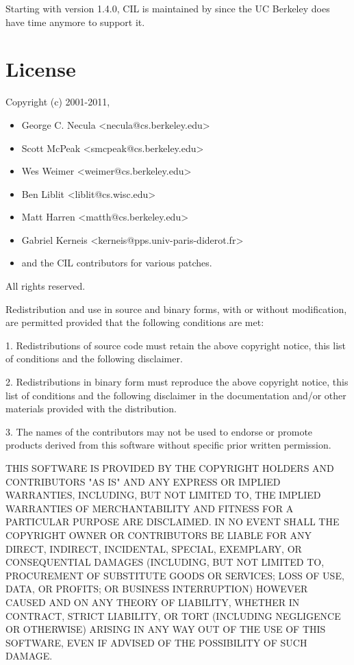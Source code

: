 \documentclass[letterpaper]{article}
\begin{document}
Starting with version 1.4.0, CIL is maintained by
 since the UC
Berkeley does have time anymore to support it.

\section{License}

Copyright (c) 2001-2011,
\begin{itemize}
\item George C. Necula    <necula@cs.berkeley.edu>
\item Scott McPeak        <smcpeak@cs.berkeley.edu>
\item Wes Weimer          <weimer@cs.berkeley.edu>
\item Ben Liblit          <liblit@cs.wisc.edu>
\item Matt Harren         <matth@cs.berkeley.edu>
\item Gabriel Kerneis     <kerneis@pps.univ-paris-diderot.fr>
\item and the CIL contributors for various patches.
\end{itemize}
All rights reserved.

Redistribution and use in source and binary forms, with or without
modification, are permitted provided that the following conditions are met:

1. Redistributions of source code must retain the above copyright notice,
this list of conditions and the following disclaimer.

2. Redistributions in binary form must reproduce the above copyright notice,
this list of conditions and the following disclaimer in the documentation
and/or other materials provided with the distribution.

3. The names of the contributors may not be used to endorse or promote
products derived from this software without specific prior written
permission.

THIS SOFTWARE IS PROVIDED BY THE COPYRIGHT HOLDERS AND CONTRIBUTORS "AS IS"
AND ANY EXPRESS OR IMPLIED WARRANTIES, INCLUDING, BUT NOT LIMITED TO, THE
IMPLIED WARRANTIES OF MERCHANTABILITY AND FITNESS FOR A PARTICULAR PURPOSE
ARE DISCLAIMED. IN NO EVENT SHALL THE COPYRIGHT OWNER OR CONTRIBUTORS BE
LIABLE FOR ANY DIRECT, INDIRECT, INCIDENTAL, SPECIAL, EXEMPLARY, OR
CONSEQUENTIAL DAMAGES (INCLUDING, BUT NOT LIMITED TO, PROCUREMENT OF
SUBSTITUTE GOODS OR SERVICES; LOSS OF USE, DATA, OR PROFITS; OR BUSINESS
INTERRUPTION) HOWEVER CAUSED AND ON ANY THEORY OF LIABILITY, WHETHER IN
CONTRACT, STRICT LIABILITY, OR TORT (INCLUDING NEGLIGENCE OR OTHERWISE)
ARISING IN ANY WAY OUT OF THE USE OF THIS SOFTWARE, EVEN IF ADVISED OF THE
POSSIBILITY OF SUCH DAMAGE.
\end{document}
